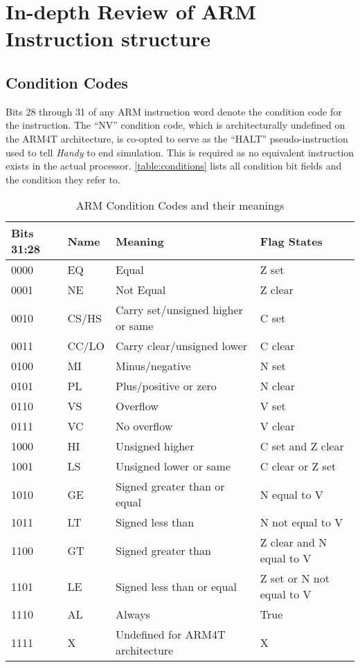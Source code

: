 
\chapter{In-depth Review of ARM Instruction structure}
\label{appendix:instructions}


\section{Condition Codes}
\label{sec:appendix:conditions}

Bits 28 through 31 of any ARM instruction word denote the condition code for the instruction. The ``NV'' condition code, which is architecturally undefined on the ARM4T architecture, is co-opted to serve as the ``HALT'' pseudo-instruction used to tell \emph{Handy} to end simulation. This is required as no equivalent instruction exists in the actual processor. \autoref{table:conditions} lists all condition bit fields and the condition they refer to.

\begin{table}
  \caption{ARM Condition Codes and their meanings\citep[pp. A3-4]{armarm:2005}}
  \label{table:conditions}
  \begin{tabularx}{\textwidth}{l|l|X|X}
    Bits 31:28 & Name & Meaning & Flag States \\ \hline
    0000 & EQ & Equal & Z set \\ \hline
    0001 & NE & Not Equal & Z clear \\ \hline
    0010 & CS/HS & Carry set/unsigned higher or same & C set \\ \hline
    0011 & CC/LO & Carry clear/unsigned lower & C clear \\ \hline
    0100 & MI & Minus/negative & N set \\ \hline
    0101 & PL & Plus/positive or zero & N clear \\ \hline
    0110 & VS & Overflow & V set \\ \hline
    0111 & VC & No overflow & V clear \\ \hline
    1000 & HI & Unsigned higher & C set and Z clear \\ \hline
    1001 & LS & Unsigned lower or same & C clear or Z set \\ \hline
    1010 & GE & Signed greater than or equal & N equal to V \\ \hline
    1011 & LT & Signed less than & N not equal to V \\ \hline
    1100 & GT & Signed greater than & Z clear and N equal to V \\ \hline
    1101 & LE & Signed less than or equal & Z set or N not equal to V \\ \hline
    1110 & AL & Always & True \\ \hline
    1111 & X & Undefined for ARM4T architecture & X
  \end{tabularx}
\end{table}


